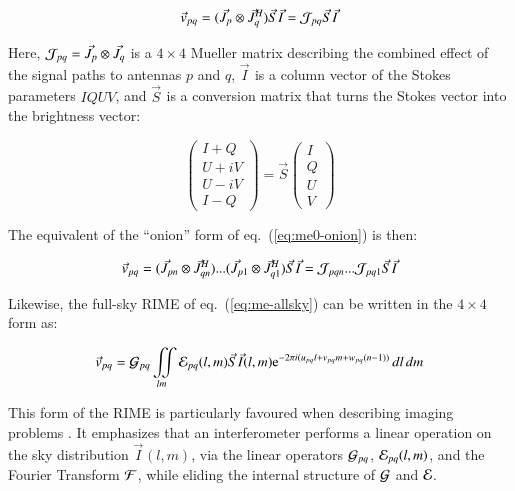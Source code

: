 \documentclass[]{aa}
\newcommand{\herm}{H}
\newcommand{\jones}[2]{\vec {#1}_{#2}}
\newcommand{\jonesT}[2]{\vec {#1}^{\herm}_{#2}}
\begin{document}
    \begin{equation}\label{eq:me:mueller}
    \vec v_{pq} = ( \jones{J}{p} \otimes \jonesT{J}{q} ) \jones{S}{} \jones{I}{} = {\cal J}_{pq} \jones{S}{} \jones{I}{}
    \end{equation}

Here, ${\cal J}_{pq}=\jones{J}{p} \otimes \jones{J}{q}$ is a $4\times4$ Mueller matrix describing the combined effect of the signal paths to antennas $p$ and $q$, $\jones{I}{}$ is a column vector of the Stokes parameters $IQUV$, and $\jones{S}{}$ is a conversion matrix that turns the Stokes vector into the brightness vector:

\[
\left ( \begin{array}{c}
I+Q \\ U+iV \\ U-iV \\ I-Q
\end{array} \right ) 
= \jones{S}{} 
\left ( \begin{array}{c}
I \\ Q \\ U \\ V
\end{array} \right ) 
\]

The equivalent of the ``onion'' form of eq.~(\ref{eq:me0-onion}) is then:

    \begin{equation}\label{eq:me:mueller-onion}
    \vec v_{pq} = ( \jones{J}{pn} \otimes \jonesT{J}{qn} ) ... ( \jones{J}{p1} \otimes \jonesT{J}{q1} ) \jones{S}{} \jones{I}{}
= {\cal J}_{pqn} ...  {\cal J}_{pq1} \jones{S}{} \jones{I}{}
    \end{equation}


Likewise, the full-sky RIME of eq.~(\ref{eq:me-allsky}) can be written in the $4\times4$ form as:

    \begin{equation}\label{eq:allsky:mueller}
\vec v_{pq} = {\cal G}_{pq} \iint\limits_{lm} {\cal E}_{pq}(l,m) \jones{S}{} \jones{I}{}(l,m) {\rm e}^{-2\pi i(u_{pq} l+v_{pq} m+w_{pq} (n-1))} \,dl\,dm 
    \end{equation}

This form of the RIME is particularly favoured when describing imaging problems \citep{SB:imageplane,Rau:DDEs}. It emphasizes that an interferometer performs a linear operation on the sky distribution $\jones{I}{}(l,m)$, via the linear operators ${\cal G}_{pq}$, ${\cal E}_{pq}(l,m)$, and the Fourier Transform $\cal F$, while eliding the internal structure of ${\cal G}$ and ${\cal E}$.
\end{document}
